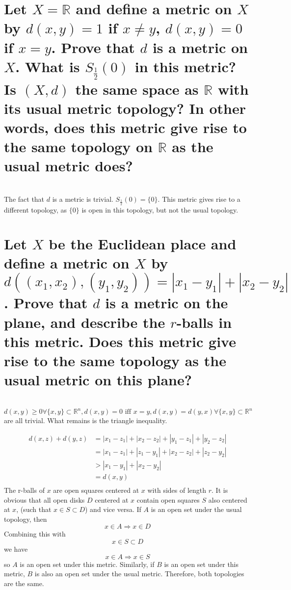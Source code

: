\begin{parts}
 
 \part{Let $X = \mathbb{R}$ and define a metric on $X$ by $d(x,y) = 1$ if $x \neq y$, $d(x,y) = 0$ if $x = y$. Prove that $d$ is a metric on $X$. What is $S_\frac{1}{2}(0)$ in this metric? Is $(X,d)$ the same space as $\mathbb{R}$ with its usual metric topology? In other words, does this metric give rise to the same topology on $\mathbb{R}$ as the usual metric does?}
 
 
\begin{solution}
 \\The fact that $d$ is a metric is trivial. $S_\frac{1}{2}(0) = \{0\}$. This metric gives rise to a different topology, as $\{0\}$ is open in this topology, but not the usual topology.
\end{solution}

\part{Let $X$ be the Euclidean place and define a metric on $X$ by $d((x_1,x_2),(y_1,y_2)) = |x_1-y_1| + |x_2 - y_2|$. Prove that $d$ is a metric on the plane, and describe the $r$-balls in this metric. Does this metric give rise to the same topology as the usual metric on this plane?}

\begin{solution}
 \\ $d(x,y) \geq 0 \forall \{x,y\} \subset \mathbb{R}^n, d(x,y) = 0 \text{ iff } x = y, d(x,y) = d(y,x) \forall \{x,y\} \subset \mathbb{R}^n$ are all trivial. What remains is the triangle inequality.

\begin{align*}
 d(x,z) + d(y,z) &= |x_1 - z_1| + |x_2 - z_2| + |y_1 - z_1| + |y_2 - z_2| \\
 &= |x_1 - z_1| + |z_1 - y_1| + |x_2 - z_2| + |z_2 - y_2| \\
 &> |x_1 - y_1| + |x_2 - y_2| \\
 &= d(x,y) \\
\end{align*}
The r-balls of $x$ are open squares centered at $x$ with sides of length $r$. It is obvious that all open disks $D$ centered at $x$ contain open squares $S$ also centered at $x$, (such that $x \in S \subset D$) and vice versa. If $A$ is an open set under the usual topology, then
$$x \in A \Rightarrow x \in D$$
Combining this with
$$x \in S \subset D$$
we have
$$x \in A \Rightarrow x \in S$$
so $A$ is an open set under this metric. Similarly, if $B$ is an open set under this metric, $B$ is also an open set under the usual metric. Therefore, both topologies are the same.
\end{solution}
\end{parts}

